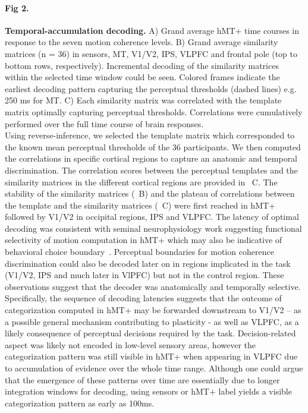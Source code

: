 \paragraph*{Fig 2.} \label{fig:fig2}
{\bf Temporal-accumulation decoding.} A) Grand average hMT+ time courses in response to the seven motion coherence levels. B) Grand average similarity matrices (n = 36) in sensors, MT, V1/V2,  IPS, VLPFC and frontal pole (top to bottom rows, respectively). Incremental decoding of the similarity matrices within the selected time window could be seen. Colored frames indicate the earliest decoding pattern capturing the perceptual thresholds (dashed lines) e.g. 250 ms for MT. C) Each similarity matrix was correlated with the template matrix optimally capturing perceptual thresholds. Correlations were cumulatively performed over the full time course of brain responses.
\\
\vspace{10pt}
Using reverse-inference, we selected the template matrix which corresponded to the known mean perceptual thresholds of the 36 participants. We then computed the correlations in specific cortical regions to capture an anatomic and temporal discrimination. The correlation scores between the perceptual templates and the similarity matrices in the different cortical regions are provided in ~C. The stability of the similarity matrices (~B) and the plateau of correlations between the template and the similarity matrices (~C) were first reached in hMT+ followed by V1/V2 in occipital regions, IPS and VLPFC. The latency of optimal decoding was consistent with seminal neurophysiology work suggesting functional selectivity of motion computation in hMT+ which may also be indicative of behavioral choice boundary~\cite{3jazayeri2006optimal,4rust2006mt,14serences2007representation,30britten1996relationship}. 
Perceptual boundaries for motion coherence discrimination could also be decoded later on in regions implicated in the task (V1/V2, IPS and much later in VlPFC) but not in the control region. These observations suggest that the decoder was anatomically and temporally selective. Specifically, the sequence of decoding latencies suggests that the outcome of categorization computed in hMT+ may be forwarded downstream to V1/V2 – as a possible general mechanism contributing to plasticity - as well as VLPFC, as a likely consequence of perceptual decisions required by the task. Decision-related aspect was likely not encoded in low-level sensory areas, however the categorization pattern was still visible in hMT+ when appearing in VLPFC due to accumulation of evidence over the whole time range. Although one could argue that the emergence of these patterns over time are essentially due to longer integration windows for decoding, using sensors or hMT+ label yields a visible categorization pattern as early as 100ms.

